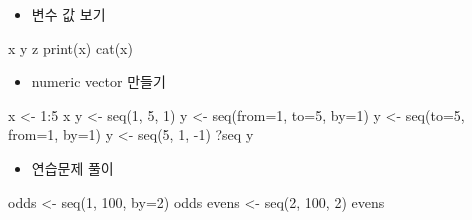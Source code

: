 \documentclass[
]{book}
\newenvironment{Shaded}{\begin{snugshade}}{\end{snugshade}}
\newcommand{\AttributeTok}[1]{\textcolor[rgb]{0.77,0.63,0.00}{#1}}
\newcommand{\DecValTok}[1]{\textcolor[rgb]{0.00,0.00,0.81}{#1}}
\newcommand{\FunctionTok}[1]{\textcolor[rgb]{0.00,0.00,0.00}{#1}}
\newcommand{\NormalTok}[1]{#1}
\newcommand{\OtherTok}[1]{\textcolor[rgb]{0.56,0.35,0.01}{#1}}
\newcommand{\SpecialCharTok}[1]{\textcolor[rgb]{0.00,0.00,0.00}{#1}}
\providecommand{\tightlist}{%
  \setlength{\itemsep}{0pt}\setlength{\parskip}{0pt}}
\begin{document}
\begin{itemize}
\tightlist
\item
  변수 값 보기
\end{itemize}

\begin{Shaded}
\begin{Highlighting}[]
\NormalTok{x}
\NormalTok{y}
\NormalTok{z}
\FunctionTok{print}\NormalTok{(x)}
\FunctionTok{cat}\NormalTok{(x)}
\end{Highlighting}
\end{Shaded}

\begin{itemize}
\tightlist
\item
  numeric vector 만들기
\end{itemize}

\begin{Shaded}
\begin{Highlighting}[]
\NormalTok{x }\OtherTok{\textless{}{-}} \DecValTok{1}\SpecialCharTok{:}\DecValTok{5}
\NormalTok{x}
\NormalTok{y }\OtherTok{\textless{}{-}} \FunctionTok{seq}\NormalTok{(}\DecValTok{1}\NormalTok{, }\DecValTok{5}\NormalTok{, }\DecValTok{1}\NormalTok{)}
\NormalTok{y }\OtherTok{\textless{}{-}} \FunctionTok{seq}\NormalTok{(}\AttributeTok{from=}\DecValTok{1}\NormalTok{, }\AttributeTok{to=}\DecValTok{5}\NormalTok{, }\AttributeTok{by=}\DecValTok{1}\NormalTok{)}
\NormalTok{y }\OtherTok{\textless{}{-}} \FunctionTok{seq}\NormalTok{(}\AttributeTok{to=}\DecValTok{5}\NormalTok{, }\AttributeTok{from=}\DecValTok{1}\NormalTok{, }\AttributeTok{by=}\DecValTok{1}\NormalTok{)}
\NormalTok{y }\OtherTok{\textless{}{-}} \FunctionTok{seq}\NormalTok{(}\DecValTok{5}\NormalTok{, }\DecValTok{1}\NormalTok{, }\SpecialCharTok{{-}}\DecValTok{1}\NormalTok{)}
\NormalTok{?seq}
\NormalTok{y}
\end{Highlighting}
\end{Shaded}

\begin{itemize}
\tightlist
\item
  연습문제 풀이
\end{itemize}

\begin{Shaded}
\begin{Highlighting}[]
\NormalTok{odds }\OtherTok{\textless{}{-}} \FunctionTok{seq}\NormalTok{(}\DecValTok{1}\NormalTok{, }\DecValTok{100}\NormalTok{, }\AttributeTok{by=}\DecValTok{2}\NormalTok{)}
\NormalTok{odds  }
\NormalTok{evens }\OtherTok{\textless{}{-}} \FunctionTok{seq}\NormalTok{(}\DecValTok{2}\NormalTok{, }\DecValTok{100}\NormalTok{, }\DecValTok{2}\NormalTok{)}
\NormalTok{evens}
\end{Highlighting}
\end{Shaded}
\end{document}
